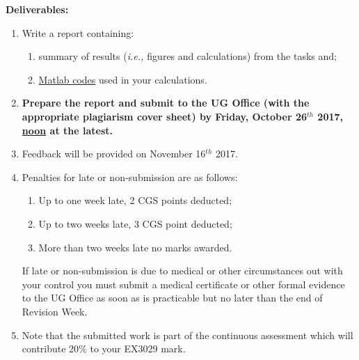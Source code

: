 \documentclass[12pts,a4paper,amsmath,amssymb,floatfix]{article}%
\newcommand{\ie}{{\em{i.e., }}}
\begin{document}
{\bf Deliverables:}
\begin{enumerate}
\item Write a report containing:
  \begin{enumerate} 
      \item summary of results (\ie figures and calculations) from the tasks and;
      \item  \underline{Matlab codes} used in your calculations.
  \end{enumerate}
%
     \item {\bf Prepare the report and submit to the UG Office (with the appropriate plagiarism cover sheet) by Friday, October 26$^{th}$ 2017, \underline{noon} at the latest.}
%
     \item Feedback will be provided on November 16$^{th}$ 2017.
%
     \item Penalties for late or non-submission are as follows:
        \begin{enumerate}%
            \item Up to one week late, 2 CGS points deducted;
            \item Up to two weeks late, 3 CGS point deducted;
            \item More than two weeks late no marks awarded.
        \end{enumerate}
        If late or non-submission is due to medical or other circumstances out with your control you must submit a medical certificate or other formal evidence to the UG Office as soon as is practicable but no later than the end of Revision Week. 
%
    \item Note that the submitted work is part of the continuous assessment which will contribute 20$\%$ to your EX3029 mark.
%
\end{enumerate}
\end{document}
